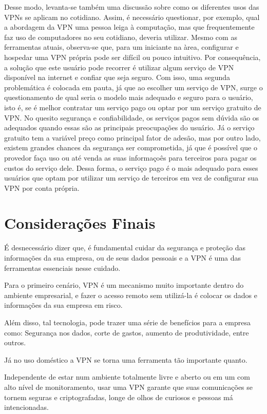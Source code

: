 \documentclass[12pt]{article}
\begin{document}
\begin{flushleft}
Desse modo, levanta-se também uma discussão sobre como os diferentes usos das VPNs se aplicam no cotidiano.
Assim, é necessário questionar, por exemplo, qual a abordagem da VPN uma pessoa leiga à
computação, mas que frequentemente faz uso de computadores no seu cotidiano, deveria utilizar.
Mesmo com as ferramentas atuais, observa-se que, para um iniciante na àrea, configurar e hospedar
uma VPN própria pode ser difícil ou pouco intuitivo.
Por consequência, a solução que este usuário pode recorrer é utilizar algum serviço de VPN disponível
na internet e confiar que seja seguro. 
Com isso, uma segunda problemática é colocada em pauta, já que ao escolher um serviço de VPN, 
surge o questionamento de qual seria o modelo mais adequado e seguro para o usuário, isto é, se é melhor
contratar um serviço pago ou optar por um serviço gratuito de VPN.
No quesito segurança e confiabilidade, os serviços pagos sem dúvida são os adequados quando essas
são as principais preocupações do usuário.
Já o serviço gratuito tem a variável preço como principal fator de adesão, mas por outro lado, existem
grandes chances da segurança ser comprometida, já que é possível que o provedor faça uso ou até venda
as suas informaçoês para terceiros para pagar os custos do serviço dele.
Dessa forma, o serviço pago é o mais adequado para esses usuários que optam por utilizar um serviço de
terceiros em vez de configurar sua VPN por conta própria. 


\section{Considerações Finais}

É desnecessário dizer que, é fundamental cuidar da segurança e proteção das informações da sua empresa, ou de seus dados pessoais e a VPN é uma das ferramentas essenciais nesse cuidado.

Para o primeiro cenário, VPN é um mecanismo muito importante dentro do ambiente empresarial, e fazer o acesso remoto sem utilizá-la é colocar os dados e informações da sua empresa em risco.

Além disso, tal tecnologia, pode trazer uma série de benefícios para a empresa como: Segurança nos dados, corte de gastos, aumento de produtividade, entre outros.

Já no uso doméstico a VPN se torna uma ferramenta tão importante quanto. 

Independente de estar num ambiente totalmente livre e aberto ou em um com alto nível de monitoramento, usar uma VPN garante que suas comunicações se tornem seguras e criptografadas, longe de olhos de curiosos e pessoas má intencionadas.


\end{flushleft}
\end{document}

